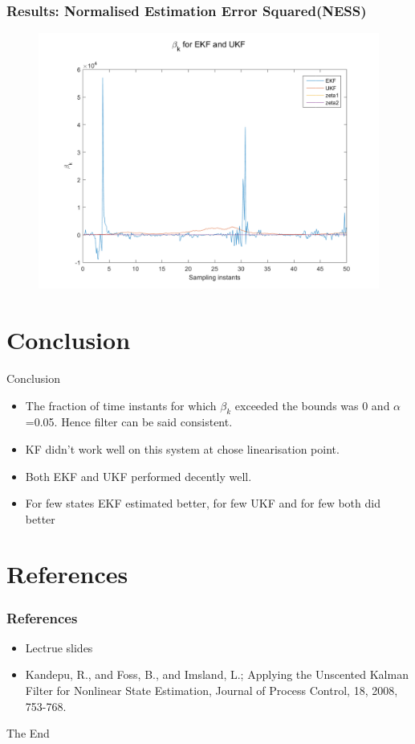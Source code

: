 \documentclass{beamer}
\begin{document}
\begin{frame}
\frametitle{Results: Normalised Estimation Error Squared(NESS)}
\begin{figure}
\includegraphics[width=0.8\linewidth]{plots/betak_noKF.png}
\end{figure}
\end{frame}
\section{Conclusion}
\begin{frame}{Conclusion}
    \begin{itemize}
        \item The fraction of time instants for which $\beta_k$ exceeded the bounds was 0 and $\alpha$=0.05. Hence filter can be said consistent.
        \item KF didn't work well on this system at chose linearisation point.
        \item Both EKF and UKF performed decently well.
        \item For few states EKF estimated better, for few UKF and for few both did better
    \end{itemize}
\end{frame}
\section{References}
\begin{frame}
\frametitle{References}
\begin{itemize}
    \item Lectrue slides
    \item Kandepu, R., and Foss, B., and Imsland, L.; Applying the Unscented Kalman Filter
for Nonlinear State Estimation, Journal of Process Control, 18, 2008, 753-768.
\end{itemize}
\end{frame}


\begin{frame}
\Huge{\centerline{The End}}
\end{frame}
\end{document}
